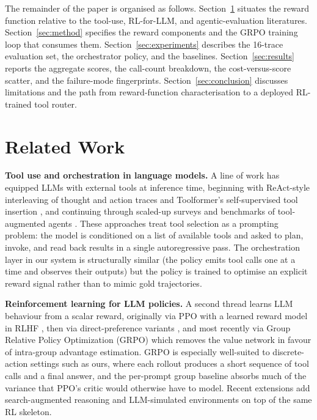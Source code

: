 \documentclass[10pt,twocolumn]{article}
\begin{document}
The remainder of the paper is organised as follows. Section~\ref{sec:related_work} situates the reward function relative to the tool-use, RL-for-LLM, and agentic-evaluation literatures. Section~\ref{sec:method} specifies the reward components and the GRPO training loop that consumes them. Section~\ref{sec:experiments} describes the 16-trace evaluation set, the orchestrator policy, and the baselines. Section~\ref{sec:results} reports the aggregate scores, the call-count breakdown, the cost-versus-score scatter, and the failure-mode fingerprints. Section~\ref{sec:conclusion} discusses limitations and the path from reward-function characterisation to a deployed RL-trained tool router.


\section{Related Work}
\label{sec:related_work}

\textbf{Tool use and orchestration in language models.} A line of work has equipped LLMs with external tools at inference time, beginning with ReAct-style interleaving of thought and action traces \cite{yao2023react} and Toolformer's self-supervised tool insertion \cite{schick2023toolformer}, and continuing through scaled-up surveys and benchmarks of tool-augmented agents \cite{qin2023toolllm, mialon2023augmented, qin2023tool}. These approaches treat tool selection as a prompting problem: the model is conditioned on a list of available tools and asked to plan, invoke, and read back results in a single autoregressive pass. The orchestration layer in our system is structurally similar (the policy emits tool calls one at a time and observes their outputs) but the policy is trained to optimise an explicit reward signal rather than to mimic gold trajectories.

\textbf{Reinforcement learning for LLM policies.} A second thread learns LLM behaviour from a scalar reward, originally via PPO with a learned reward model in RLHF \cite{ouyang2022rlhf, christiano2017deeprlhumanpref}, then via direct-preference variants \cite{rafailov2023dpo}, and most recently via Group Relative Policy Optimization (GRPO) \cite{shao2024deepseekmath, deepseek2025r1} which removes the value network in favour of intra-group advantage estimation. GRPO is especially well-suited to discrete-action settings such as ours, where each rollout produces a short sequence of tool calls and a final answer, and the per-prompt group baseline absorbs much of the variance that PPO's critic would otherwise have to model. Recent extensions add search-augmented reasoning \cite{jin2025searchr1} and LLM-simulated environments \cite{sun2025zerosearch} on top of the same RL skeleton.
\end{document}
